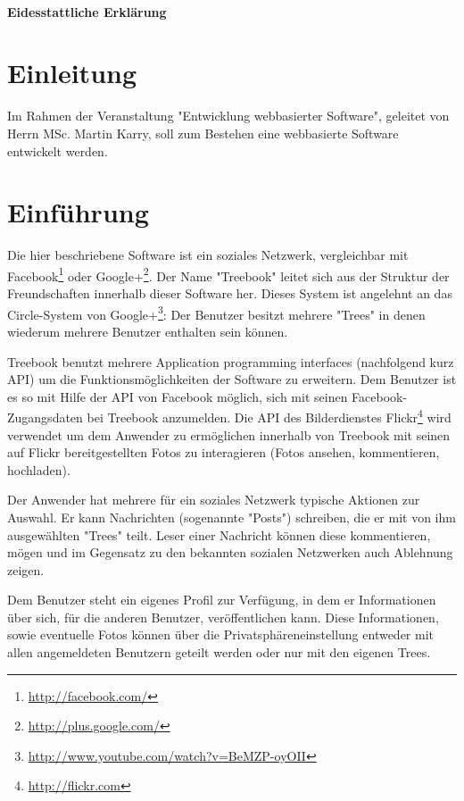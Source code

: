 \documentclass[10pt,a4paper]{book}
\begin{document}
\subsubsection{Eidesstattliche Erklärung}

\tableofcontents
\renewcommand{\chaptername}{}
\renewcommand{\thechapter}{}
\renewcommand{\thesection}{\arabic{section}}
\renewcommand{\thefigure}{\arabic{figure}}

\chapter{Einleitung}
Im Rahmen der Veranstaltung "Entwicklung webbasierter Software", geleitet von Herrn MSc. Martin Karry, soll zum Bestehen eine webbasierte Software entwickelt werden.
\chapter{Einführung}
Die hier beschriebene Software ist ein soziales Netzwerk, vergleichbar mit Facebook\footnote{\href{http://facebook.com/}{http://facebook.com/}
} oder Google+\footnote{\href{http://plus.google.com/}{http://plus.google.com/}}. Der Name "Treebook" leitet sich aus der Struktur der 
Freundschaften innerhalb dieser Software her. Dieses System ist angelehnt an das Circle-System von Google+\footnote{\href{http://www.youtube.
com/watch?v=BeMZP-oyOII}{http://www.youtube.com/watch?v=BeMZP-oyOII}}: Der Benutzer besitzt mehrere "Trees" in denen wiederum 
mehrere Benutzer enthalten sein können.

Treebook benutzt mehrere Application programming interfaces (nachfolgend kurz API) um die Funktionsmöglichkeiten der Software zu erweitern. 
Dem Benutzer ist es so mit Hilfe der API von Facebook möglich, sich mit seinen Facebook-Zugangsdaten bei Treebook anzumelden. Die API des 
Bilderdienstes Flickr\footnote{\href{http://flickr.com}{http://flickr.com}} wird verwendet um dem Anwender zu ermöglichen innerhalb von 
Treebook mit seinen auf Flickr bereitgestellten Fotos zu interagieren (Fotos ansehen, kommentieren, hochladen).

Der Anwender hat mehrere für ein soziales Netzwerk typische Aktionen zur Auswahl. Er kann Nachrichten (sogenannte "Posts") schreiben, die er 
mit von ihm ausgewählten "Trees" teilt. Leser einer Nachricht können diese kommentieren, mögen und im Gegensatz zu den bekannten sozialen 
Netzwerken auch Ablehnung zeigen.

Dem Benutzer steht ein eigenes Profil zur Verfügung, in dem er Informationen über sich, für die anderen Benutzer, veröffentlichen kann. Diese 
Informationen, sowie eventuelle Fotos können über die Privatsphäreneinstellung entweder mit allen angemeldeten Benutzern geteilt werden oder 
nur mit den eigenen Trees.
\end{document}
